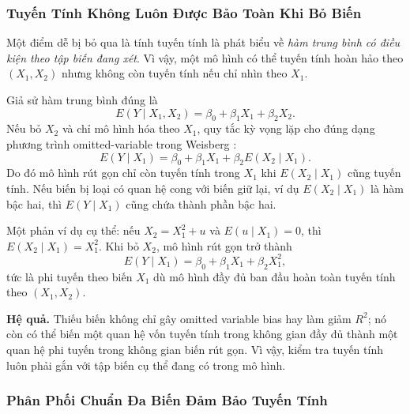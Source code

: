 \subsubsection{Tuyến Tính Không Luôn Được Bảo Toàn Khi Bỏ Biến}

Một điểm dễ bị bỏ qua là tính tuyến tính là phát biểu về \textit{hàm trung bình có điều kiện theo tập biến đang xét}. Vì vậy, một mô hình có thể tuyến tính hoàn hảo theo $(X_1, X_2)$ nhưng không còn tuyến tính nếu chỉ nhìn theo $X_1$.

Giả sử hàm trung bình đúng là
\[
  E(Y \mid X_1, X_2) = \beta_0 + \beta_1 X_1 + \beta_2 X_2.
\]
Nếu bỏ $X_2$ và chỉ mô hình hóa theo $X_1$, quy tắc kỳ vọng lặp cho đúng dạng phương trình omitted-variable trong Weisberg \cite[Eq.~4.8, Sec.~4.2.1]{weisberg2014applied}:
\[
  E(Y \mid X_1)
  = \beta_0 + \beta_1 X_1 + \beta_2 E(X_2 \mid X_1).
\]
Do đó mô hình rút gọn chỉ còn tuyến tính trong $X_1$ khi $E(X_2 \mid X_1)$ cũng tuyến tính. Nếu biến bị loại có quan hệ cong với biến giữ lại, ví dụ $E(X_2 \mid X_1)$ là hàm bậc hai, thì $E(Y \mid X_1)$ cũng chứa thành phần bậc hai.


Một phản ví dụ cụ thể: nếu $X_2 = X_1^2 + u$ và $E(u \mid X_1)=0$, thì $E(X_2 \mid X_1)=X_1^2$. Khi bỏ $X_2$, mô hình rút gọn trở thành
\[
  E(Y \mid X_1) = \beta_0 + \beta_1 X_1 + \beta_2 X_1^2,
\]
tức là phi tuyến theo biến $X_1$ dù mô hình đầy đủ ban đầu hoàn toàn tuyến tính theo $(X_1, X_2)$.

\textbf{Hệ quả.} Thiếu biến không chỉ gây omitted variable bias hay làm giảm $R^2$; nó còn có thể biến một quan hệ vốn tuyến tính trong không gian đầy đủ thành một quan hệ phi tuyến trong không gian biến rút gọn. Vì vậy, kiểm tra tuyến tính luôn phải gắn với tập biến cụ thể đang có trong mô hình.

\subsubsection{Phân Phối Chuẩn Đa Biến Đảm Bảo Tuyến Tính}

